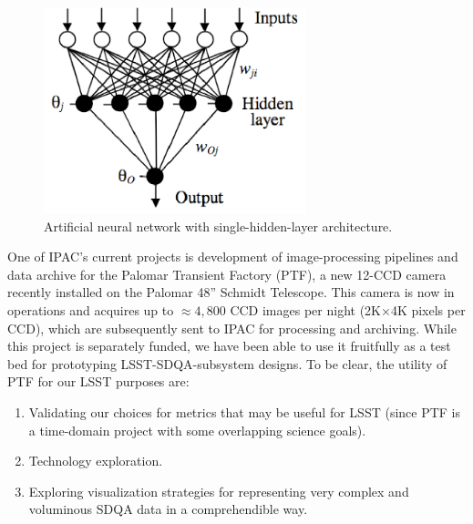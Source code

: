 \begin{figure}[htb]
\begin{centering}
\includegraphics[width=3in]{images/O7A2_2}
\caption{Artificial neural network with single-hidden-layer architecture.} 
 \label{ANN}
\end{centering}
\end{figure}


One of IPAC's current projects is development of image-processing pipelines and data archive
for the Palomar Transient Factory (PTF), a new 12-CCD camera recently installed on the Palomar
48'' Schmidt Telescope.  This camera is now in operations and acquires up to $\approx 4,800$
CCD images per night (2K$\times$4K pixels per CCD), 
which are subsequently sent to IPAC for processing and archiving.  
While this project is separately funded, we have been able to use
it fruitfully as a test bed for prototyping LSST-SDQA-subsystem designs.  
To be clear, the utility of PTF for our LSST purposes are:

\begin{enumerate} 
\item{Validating our choices for metrics that may be useful for LSST (since PTF is a 
time-domain project with some overlapping science goals).}
\item{Technology exploration.}
\item{Exploring visualization strategies for representing very complex and 
voluminous SDQA data in a comprehendible way.}
\end{enumerate} 

